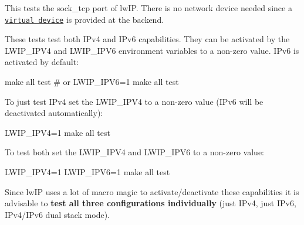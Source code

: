 This tests the {\ttfamily sock\+\_\+tcp} port of lw\+IP. There is no network device needed since a \href{http://doc.riot-os.org/group__sys__netdev__test.html}{\tt virtual device} is provided at the backend.

These tests test both I\+Pv4 and I\+Pv6 capabilities. They can be activated by the {\ttfamily L\+W\+I\+P\+\_\+\+I\+P\+V4} and {\ttfamily L\+W\+I\+P\+\_\+\+I\+P\+V6} environment variables to a non-\/zero value. I\+Pv6 is activated by default\+:


\begin{DoxyCode}
make all test
# or
LWIP\_IPV6=1 make all test
\end{DoxyCode}


To just test I\+Pv4 set the {\ttfamily L\+W\+I\+P\+\_\+\+I\+P\+V4} to a non-\/zero value (I\+Pv6 will be deactivated automatically)\+:


\begin{DoxyCode}
LWIP\_IPV4=1 make all test
\end{DoxyCode}


To test both set the {\ttfamily L\+W\+I\+P\+\_\+\+I\+P\+V4} and {\ttfamily L\+W\+I\+P\+\_\+\+I\+P\+V6} to a non-\/zero value\+:


\begin{DoxyCode}
LWIP\_IPV4=1 LWIP\_IPV6=1 make all test
\end{DoxyCode}


Since lw\+IP uses a lot of macro magic to activate/deactivate these capabilities it is advisable to {\bfseries test all three configurations individually} (just I\+Pv4, just I\+Pv6, I\+Pv4/\+I\+Pv6 dual stack mode). 